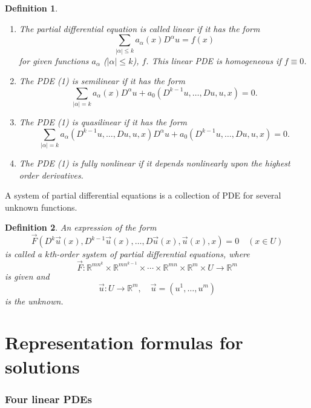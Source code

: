 \documentclass[a4paper,12pt]{report}
\newtheorem{definition}{Definition}[section]
\begin{document}
\begin{definition}
\begin{enumerate}
    \item[(i)] The partial differential equation is called \textit{linear} if it has the form
    \[
    \sum_{|\alpha| \leq k} a_\alpha(x) D^\alpha u = f(x)
    \]
    for given functions $a_\alpha$ ($|\alpha| \leq k$), $f$. This linear \textit{PDE} is homogeneous if $f \equiv 0$.

    \item[(ii)] The \textit{PDE} (1) is \textit{semilinear} if it has the form
    \[
    \sum_{|\alpha| = k} a_\alpha(x) D^\alpha u + a_0\left(D^{k-1} u, \ldots, Du, u, x\right) = 0.
    \]

    \item[(iii)] The \textit{PDE} (1) is \textit{quasilinear} if it has the form
    \[
    \sum_{|\alpha| = k} a_\alpha\left(D^{k-1} u, \ldots, Du, u, x\right) D^\alpha u + a_0\left(D^{k-1} u, \ldots, Du, u, x\right) = 0.
    \]

    \item[(iv)] The \textit{PDE} (1) is \textit{fully nonlinear} if it depends nonlinearly upon the highest order derivatives.
\end{enumerate}
\end{definition}
A system of partial differential equations is a collection of PDE for several unknown functions. 
\begin{definition}
An expression of the form
\[
\vec{F}\left(D^k \vec{u}(x), D^{k-1} \vec{u}(x), \ldots, D \vec{u}(x), \vec{u}(x), x\right) = 0 \quad (x \in U)
\]
is called a \textit{\(k\)th-order system of partial differential equations}, where
\[
\vec{F} : \mathbb{R}^{mn^k} \times \mathbb{R}^{mn^{k-1}} \times \cdots \times \mathbb{R}^{mn} \times \mathbb{R}^m \times U \to \mathbb{R}^m
\]
is given and
\[
\vec{u} : U \to \mathbb{R}^m, \quad \vec{u} = (u^1, \ldots, u^m)
\]
is the unknown.
\end{definition}
\part{Representation formulas for solutions}
\section{Four linear PDEs}
\end{document}
